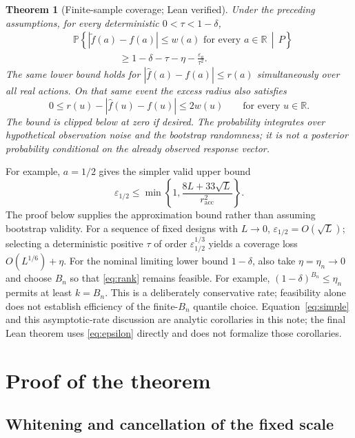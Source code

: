 \documentclass[11pt]{article}
\newtheorem{theorem}{Theorem}
\newcommand{\Prob}{\mathbb P}
\newcommand{\R}{\mathbb R}
\begin{document}
\begin{theorem}[Finite-sample coverage; Lean verified]\label{thm:main}
Under the preceding assumptions, for every deterministic
$0<\tau<1-\delta$,
\begin{align}
 &\Prob\left\{
   |\widetilde f(a)-f(a)|\le w(a)\text{ for every }a\in\R
   \,\middle|\, P\right\}\nonumber\\
 &\hspace{2cm}\ge
 1-\delta-\tau-\eta-\frac{\varepsilon_a}{\tau^2}.
 \label{eq:coverage}
\end{align}
The same lower bound holds for
$|\widehat f(a)-f(a)|\le r(a)$ simultaneously over all real actions.
On that same event the excess radius also satisfies
\[
 0\le r(u)-|\widehat f(u)-f(u)|\le2w(u)\qquad\text{for every }u\in\R.
\]
The bound is clipped below at zero if desired. The probability integrates
over hypothetical observation noise and the bootstrap randomness; it is not
a posterior probability conditional on the already observed response vector.
\end{theorem}

For example, $a=1/2$ gives the simpler valid upper bound
\begin{equation}\label{eq:simple}
 \varepsilon_{1/2}\le
 \min\left\{1,
       \frac{8L+33\sqrt L}{r_{\mathrm{acc}}^2}\right\}.
\end{equation}
The proof below supplies the approximation bound rather than assuming
bootstrap validity. For a sequence of fixed designs with $L\to0$,
$\varepsilon_{1/2}=O(\sqrt L)$; selecting a deterministic positive
$\tau$ of order $\varepsilon_{1/2}^{1/3}$ yields a coverage loss
$O(L^{1/6})+\eta$. For the nominal limiting lower bound $1-\delta$, also take
$\eta=\eta_n\to0$ and choose $B_n$ so that \eqref{eq:rank} remains feasible.
For example, $(1-\delta)^{B_n}\le\eta_n$ permits at least $k=B_n$.
This is a deliberately conservative rate; feasibility alone does not establish
efficiency of the finite-$B_n$ quantile choice.
Equation~\eqref{eq:simple} and this asymptotic-rate discussion are analytic
corollaries in this note; the final Lean theorem uses \eqref{eq:epsilon}
directly and does not formalize those corollaries.

\section{Proof of the theorem}

\subsection{Whitening and cancellation of the fixed scale}
\end{document}
